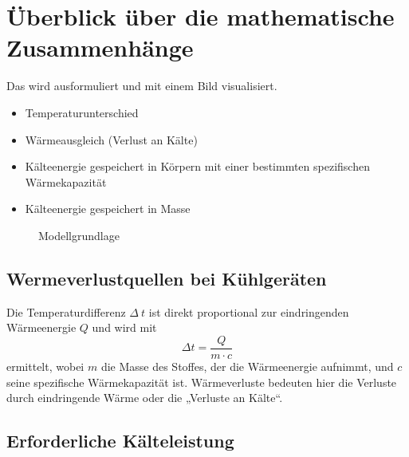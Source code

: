 
%

\section{Überblick über die mathematische Zusammenhänge}

Das wird ausformuliert und mit einem Bild visualisiert.
\begin{itemize}
	\item Temperaturunterschied
	\item Wärmeausgleich (Verlust an Kälte)
	\item Kälteenergie gespeichert in Körpern mit einer bestimmten spezifischen Wärmekapazität
	\item Kälteenergie gespeichert in Masse
\end{itemize}
\begin{figure}\caption{ Modellgrundlage}
\end{figure}

\subsection{Wermeverlustquellen bei Kühlgeräten}

Die Temperaturdifferenz $\Delta\:t$ ist direkt proportional zur eindringenden Wärmeenergie $Q$ und wird mit
\begin{equation}
	\Delta t = \frac{Q}{m\cdot c}
\label{tdif}
\end{equation}
ermittelt, wobei $m$ die Masse des Stoffes, der die Wärmeenergie aufnimmt, und $c$ seine spezifische Wärmekapazität ist.
Wärmeverluste bedeuten hier die Verluste durch eindringende Wärme oder die „Verluste an Kälte“\cite{caro}.

\subsection{Erforderliche Kälteleistung}

